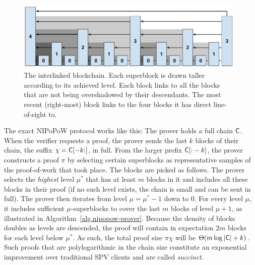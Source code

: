 

\begin{figure}[ht]
    \centering
    \includegraphics[width=0.9\columnwidth,keepaspectratio]{figures/prelims/level-shadows.pdf}
    \caption{The interlinked blockchain. Each superblock is drawn taller
    according to its achieved level. Each block links to all the blocks that are
    not being overshadowed by their descendants. The most recent (right-most)
    block links to the four blocks it has direct line-of-sight to.}
    \label{fig.hierarchy}
\end{figure}

The exact NIPoPoW protocol works like this: The prover holds a full chain
$\mathsf{C}$. When the verifier requests a proof, the prover sends the last $k$
blocks of their chain, the suffix $\chi = \mathsf{C}[-k{:}]$, in full. From the
larger prefix $\mathsf{C}[{:}-k]$, the prover constructs a proof $\pi$ by selecting
certain superblocks as representative samples of the proof-of-work that took
place. The blocks are picked as follows. The prover selects the \emph{highest}
level $\mu^*$ that has at least $m$ blocks in it and includes all these blocks
in their proof (if no such level exists, the chain is small and can be sent in
full). The prover then iterates from level $\mu = \mu^* - 1$ down to $0$. For
every level $\mu$, it includes sufficient $\mu$-superblocks to cover the last
$m$ blocks of level $\mu + 1$, as illustrated in
Algorithm~\ref{alg.nipopow-prover}. Because the density of blocks doubles as
levels are descended, the proof will contain in expectation $2m$ blocks for each
level below $\mu^*$. As such, the total proof size $\pi \chi$ will be
$\Theta(m\log|\mathsf{C}| + k)$. Such proofs that are polylogarithmic in the chain
size constitute an exponential improvement over traditional SPV clients and are
called \emph{succinct}.

